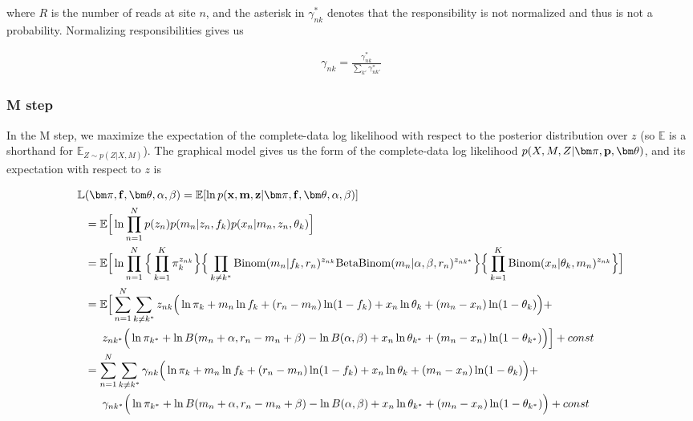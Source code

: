 \documentclass[a4paper]{article}
\newcommand{\vf}{{\bf f}}
\newcommand{\vp}{{\bf p}}
\newcommand{\vz}{{\bf z}}
\newcommand{\vm}{{\bf m}}
\newcommand{\vx}{{\bf x}}
\newcommand{\vpi}{{\bm \pi}}
\newcommand{\vtheta}{{\bm \theta}}
\newcommand{\E}{\mathbb{E}}
\begin{document}
where $R$ is the number of reads at site $n$, and the asterisk in $\gamma^*_{nk}$ denotes that the responsibility is not normalized and thus is not a probability. Normalizing responsibilities gives us

\begin{align}
\gamma_{nk} = \frac{\gamma^*_{nk}}{\sum_{k'} \gamma^*_{nk'}}
\end{align}

\subsubsection{M step}
In the M step, we maximize the expectation of the complete-data log likelihood with respect to the posterior distribution over $z$ (so $\E$ is a shorthand for $\E_{Z \sim p(Z|X,M)}$). The graphical model gives us the form of the complete-data log likelihood $p(X, M, Z | \vpi, \vp, \vtheta)$, and its expectation with respect to $z$ is

\begin{align}
\mathbb{L}&(\vpi, \vf, \vtheta, \alpha, \beta) = \E [ \ln p(\vx, \vm , \vz | \vpi, \vf, \vtheta, \alpha, \beta) ] \nonumber \\
           &= \E \Big [ \ln \prod_{n = 1}^{N}  p(z_n) p(m_n | z_n, f_{k} ) p(x_n | m_n, z_n, \theta_k ) \Big ] \nonumber \\
           &= \E \Big [ \ln \prod_{n = 1}^{N} \Big \{ \prod_{k = 1}^{K} \pi_{k}^{z_{nk}} \Big \} \Big \{ \prod_{k \neq k^*} \mathrm{Binom}(m_n | f_k, r_n)^{z_{nk}} \mathrm{BetaBinom}(m_n | \alpha, \beta, r_n)^{z_{nk^*}} \Big \} \Big \{ \prod_{k = 1}^{K} \mathrm{Binom}(x_n | \theta_k, m_n) ^{z_{nk}} \Big \} \Big ] \notag \\
            &= \E \Big [ \sum_{n = 1}^{N} \sum_{k \neq k^*} z_{nk} \Big ( \ln \pi_{k}  + m_n \ln f_k + (r_n - m_n) \ln (1-f_k) + x_n \ln \theta_k + (m_n - x_n) \ln (1 - \theta_k) \Big )  + \notag \\
            &\phantom{--} z_{nk^*} \Big ( \ln \pi_{k^*} + \ln B(m_n + \alpha, r_n - m_n + \beta) - \ln B(\alpha, \beta) + x_n \ln \theta_{k^*} + (m_n - x_n) \ln (1 - \theta_{k^*}) \Big ) \Big ] + const \nonumber \\
            &= \sum_{n = 1}^{N} \sum_{k \neq k^*} \gamma_{nk} \Big ( \ln \pi_{k}  + m_n \ln f_k + (r_n - m_n) \ln (1-f_k) + x_n \ln \theta_k + (m_n - x_n) \ln (1 - \theta_k) \Big )  + \notag \\
            &\phantom{--} \gamma_{nk^*} \Big ( \ln \pi_{k^*} + \ln B(m_n + \alpha, r_n - m_n + \beta) - \ln B(\alpha, \beta) + x_n \ln \theta_{k^*} + (m_n - x_n) \ln (1 - \theta_{k^*}) \Big ) + const  \label{eq:expjointLL}
\end{align} 
\end{document}
